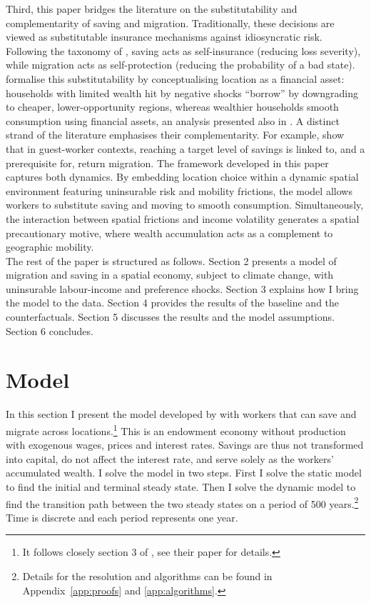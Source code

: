 \documentclass[12pt, a4paper]{article}
\begin{document}
Third, this paper bridges the literature on the substitutability and complementarity of saving and migration. Traditionally, these decisions are viewed as substitutable insurance mechanisms against idiosyncratic risk. Following the taxonomy of \citet{ehrlich_market_1972}, saving acts as self-insurance (reducing loss severity), while migration acts as self-protection (reducing the probability of a bad state). \citet{bilal_location_2021} formalise this substitutability by conceptualising location as a financial asset: households with limited wealth hit by negative shocks ``borrow'' by downgrading to cheaper, lower-opportunity regions, whereas wealthier households smooth consumption using financial assets, an analysis presented also in \cite{giannone_unpacking_2023}. A distinct strand of the literature emphasises their complementarity. For example, \citet{berninghaus_role_1993} show that in guest-worker contexts, reaching a target level of savings is linked to, and a prerequisite for, return migration. The framework developed in this paper captures both dynamics. By embedding location choice within a dynamic spatial environment featuring uninsurable risk and mobility frictions, the model allows workers to substitute saving and moving to smooth consumption. Simultaneously, the interaction between spatial frictions and income volatility generates a spatial precautionary motive, where wealth accumulation acts as a complement to geographic mobility. \\

The rest of the paper is structured as follows. Section 2 presents a model of migration and saving in a spatial economy, subject to climate change, with uninsurable labour-income and preference shocks. Section 3 explains how I bring the model to the data. Section 4 provides the results of the baseline and the counterfactuals. Section 5 discusses the results and the model assumptions. Section 6 concludes. 


\section{Model}
\label{sec:model}
In this section I present the model developed by  \citet{dvorkin_geography_2025} with workers that can save and migrate across locations.\footnote{It follows closely section 3 of \citet{dvorkin_geography_2025}, see their paper for details.} This is an endowment economy without production with exogenous wages, prices and interest rates. Savings are thus not transformed into capital, do not affect the interest rate, and serve solely as the workers' accumulated wealth. I solve the model in two steps. First I solve the static model to find the initial and terminal steady state. Then I solve the dynamic model to find the transition path between the two steady states on a period of 500 years.\footnote{Details for the resolution and algorithms can be found in Appendix~\ref{app:proofs} and \ref{app:algorithms}.} Time is discrete and each period represents one year. 
\end{document}
